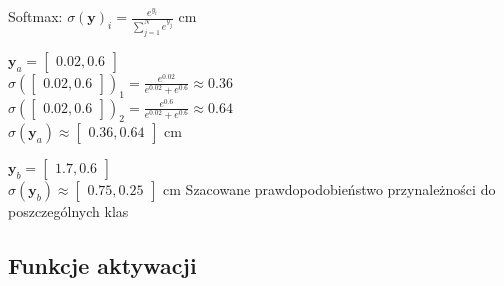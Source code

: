 \documentclass[11pt, xcolor={dvipsnames,svgnames},aspectratio=169]{beamer}
\theoremstyle{plain}
\begin{document}
\begin{frame}
	Softmax: $\sigma(\mathbf{y})_i = \frac{e^{y_i}}{\sum_{j=1}^N e^{y_j}}$ cm\pause
	
	$\mathbf{y}_a=\begin{bmatrix} 0.02, 0.6 \end{bmatrix}$\\
	$\sigma\left(\begin{bmatrix} 0.02, 0.6 \end{bmatrix}\right)_1 = \frac{e^{0.02}}{e^{0.02} + e^{0.6}}\approx 0.36$\\
	$\sigma\left(\begin{bmatrix} 0.02, 0.6 \end{bmatrix}\right)_2 = \frac{e^{0.6}}{e^{0.02} + e^{0.6}}\approx 0.64$\\
	$\sigma\left(\mathbf{y}_a\right) \approx \begin{bmatrix} 0.36, 0.64 \end{bmatrix}$ cm\pause
	
	$\mathbf{y}_b=\begin{bmatrix} 1.7, 0.6 \end{bmatrix}$\\
	$\sigma\left(\mathbf{y}_b\right) \approx \begin{bmatrix} 0.75, 0.25 \end{bmatrix}$	 cm
	Szacowane prawdopodobieństwo przynależności do poszczególnych klas
\end{frame}


\subsection{Funkcje aktywacji}
\end{document}
